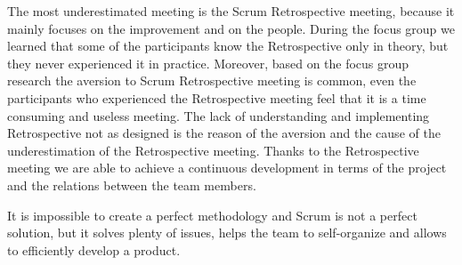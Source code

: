 The most underestimated meeting is the Scrum Retrospective meeting, because it mainly focuses on the improvement and on the people. During the focus group we learned that some of the participants know the Retrospective only in theory, but they never experienced it in practice. Moreover, based on the focus group research the aversion to Scrum Retrospective meeting is common, even the participants who experienced the Retrospective meeting feel that it is a time consuming and useless meeting. The lack of understanding and implementing Retrospective not as designed is the reason of the aversion and the cause of the underestimation of the Retrospective meeting. Thanks to the Retrospective meeting we are able to achieve a continuous development in terms of the project and the relations between the team members. 

It is impossible to create a perfect methodology and Scrum is not a perfect solution, but it solves plenty of issues, helps the team to self-organize and allows to efficiently develop a product.
